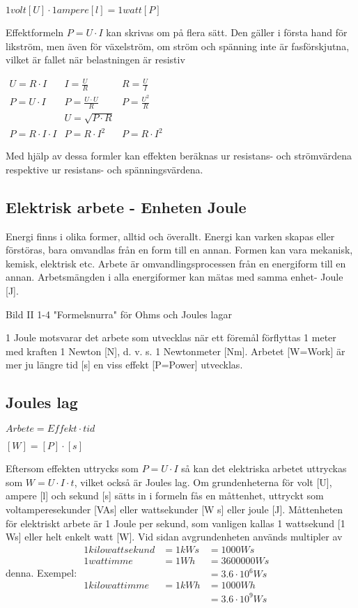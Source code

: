 \documentclass[a4paper,twoside,twocolumn,openright]{book}
\begin{document}
$1 volt [U] \cdot 1 ampere [l]= 1 watt [P]$

Effektformeln $P = U \cdot I$ kan skrivas om på
flera sätt. Den gäller i första hand för likström,
men även för växelström, om ström och
spänning inte är fasförskjutna, vilket är fallet
när belastningen är resistiv

$
\begin{array}{lll}
U = R \cdot I & I = \frac{U}{R} & R = \frac{U}{I} \\
P = U \cdot I & P = \frac{U \cdot U }{R} & P = \frac{U^2}{R} \\
&U = \sqrt{P \cdot R} & \\
P = R \cdot I \cdot I & P = R \cdot I^2 & P = R \cdot I^2
\end{array}
$

Med hjälp av dessa formler kan effekten beräknas ur resistans- och strömvärdena
respektive ur resistans- och spänningsvärdena.

\subsection{Elektrisk arbete - Enheten Joule}

Energi finns i olika former, alltid och överallt.
Energi kan varken skapas eller förstöras,
bara omvandlas från en form till en annan.
Formen kan vara mekanisk, kemisk, elektrisk etc.
Arbete är omvandlingsprocessen från
en energiform till en annan.
Arbetsmängden i alla energiformer kan
mätas med samma enhet- Joule [J].

Bild II 1-4 "Formelsnurra" för
Ohms och Joules lagar

1 Joule motsvarar det arbete som utvecklas när ett föremål förflyttas 1 meter
med kraften 1 Newton [N], d. v. s. 1 Newtonmeter [Nm].
Arbetet [W=Work] är mer ju längre tid [s]
en viss effekt [P=Power] utvecklas.

\subsection{Joules lag}

$Arbete = Effekt \cdot tid$

$[W] = [P] \cdot [s]$

Eftersom effekten uttrycks som $P = U \cdot I$
så kan det elektriska arbetet uttryckas som
$W = U \cdot I \cdot t$, vilket också är Joules lag.
Om grundenheterna för volt [U], ampere
[l] och sekund [s] sätts in i formeln fås en
måttenhet, uttryckt som voltamperesekunder
[VAs] eller wattsekunder [W s] eller joule [J].
Måttenheten för elektriskt arbete är 1
Joule per sekund, som vanligen kallas 1
wattsekund [1 Ws] eller helt enkelt watt [W].
Vid sidan avgrundenheten används multipler
av denna.
Exempel:
$
\begin{array}{lll}
1 kilowattsekund & = 1 kWs & = 1 000 Ws \\
1 wattimme & = 1 Wh & = 3600000 Ws \\
 & & = 3.6 · 10^6 Ws \\
1 kilowattimme & = 1 kWh & = 1 000 Wh \\
 & & = 3.6 · 10^9 Ws
\end{array}
$
\end{document}
